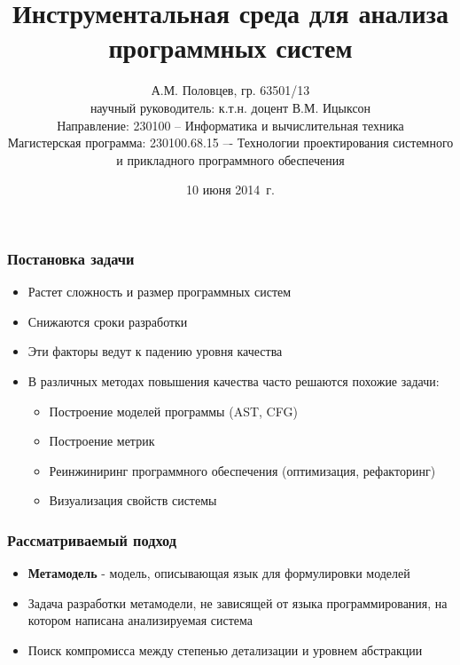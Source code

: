 \documentclass{beamer}
\title[Инструментальная среда]{Инструментальная среда для анализа программных систем}
\author[А.М. Половцев]{
    А.М. Половцев, гр. 63501/13\\
    научный руководитель: к.т.н. доцент В.М. Ицыксон\\[3ex]
    Направление: 230100 -- Информатика и вычислительная техника\\
    Магистерская программа: 230100.68.15 –- Технологии проектирования
системного и прикладного программного обеспечения
}
\institute[СПбГПУ]{Санкт-Петербургский государственный политехнический университет}
\date[10 июня 2014~г.]{10 июня 2014~г.}
\begin{document}
\frame{\titlepage}
\begin{frame}
\frametitle{Постановка задачи}

\begin{itemize}
    \item Растет сложность и размер программных систем
    \item Снижаются сроки разработки
    \item Эти факторы ведут к падению уровня качества
    \item В различных методах повышения качества часто решаются похожие задачи:
    \begin{itemize}
        \item Построение моделей программы (AST, CFG)
        \item Построение метрик
        \item Реинжиниринг программного обеспечения (оптимизация, рефакторинг)
        \item Визуализация свойств системы
    \end{itemize}
\end{itemize}
\pause
\begin{alertblock}{}
\end{alertblock}

\end{frame}
\begin{frame}
\frametitle{Рассматриваемый подход}

\begin{itemize}
    \item \textbf{Метамодель} - модель, описывающая язык для формулировки моделей
    \item Задача разработки метамодели, не зависящей от языка программирования,
    на котором написана анализируемая система
    \item Поиск компромисса между степенью детализации и уровнем абстракции
\end{itemize}

\end{frame}
\end{document}

